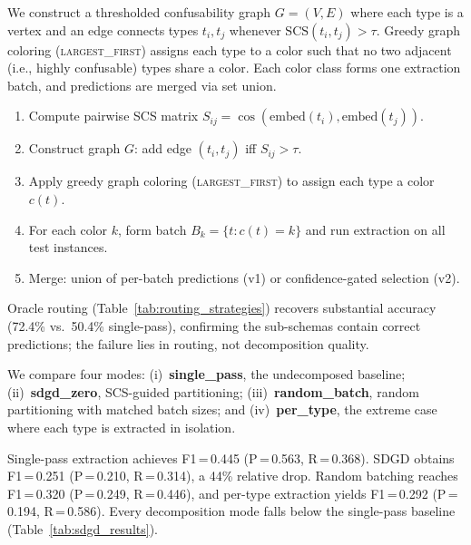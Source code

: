 \documentclass[11pt]{article}
\begin{document}
We construct a thresholded confusability graph $G = (V, E)$ where each type is a vertex and an edge connects types $t_i, t_j$ whenever $\text{SCS}(t_i, t_j) > \tau$. Greedy graph coloring (\textsc{largest\_first}) assigns each type to a color such that no two adjacent (i.e., highly confusable) types share a color. Each color class forms one extraction batch, and predictions are merged via set union.

\begin{enumerate}[leftmargin=*,itemsep=2pt]
\item Compute pairwise SCS matrix $S_{ij} = \cos(\text{embed}(t_i), \text{embed}(t_j))$.
\item Construct graph $G$: add edge $(t_i, t_j)$ iff $S_{ij} > \tau$.
\item Apply greedy graph coloring (\textsc{largest\_first}) to assign each type a color $c(t)$.
\item For each color $k$, form batch $B_k = \{t : c(t) = k\}$ and run extraction on all test instances.
\item Merge: union of per-batch predictions (v1) or confidence-gated selection (v2).
\end{enumerate}
Oracle routing (Table~\ref{tab:routing_strategies}) recovers substantial accuracy (72.4\% vs.\ 50.4\% single-pass), confirming the sub-schemas contain correct predictions; the failure lies in routing, not decomposition quality.

We compare four modes: (i)~\textbf{single\_pass}, the undecomposed baseline; (ii)~\textbf{sdgd\_zero}, SCS-guided partitioning; (iii)~\textbf{random\_batch}, random partitioning with matched batch sizes; and (iv)~\textbf{per\_type}, the extreme case where each type is extracted in isolation.

Single-pass extraction achieves F1\,=\,0.445 (P\,=\,0.563, R\,=\,0.368). SDGD obtains F1\,=\,0.251 (P\,=\,0.210, R\,=\,0.314), a 44\% relative drop. Random batching reaches F1\,=\,0.320 (P\,=\,0.249, R\,=\,0.446), and per-type extraction yields F1\,=\,0.292 (P\,=\,0.194, R\,=\,0.586). Every decomposition mode falls below the single-pass baseline (Table~\ref{tab:sdgd_results}).
\end{document}
